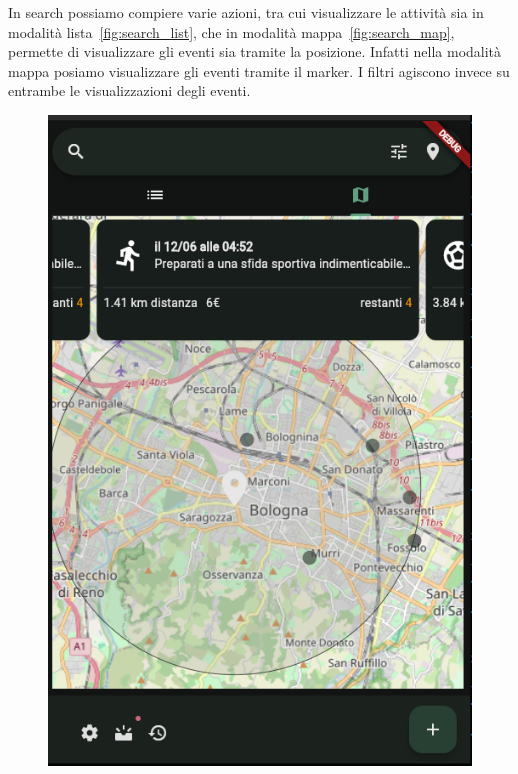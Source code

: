 \documentclass[a4paper,12pt]{article}
\begin{document}
In search possiamo compiere varie azioni, tra cui visualizzare le attività sia in modalità lista~\ref{fig:search_list}, che in modalità mappa~\ref{fig:search_map}, permette di visualizzare gli eventi sia tramite la posizione.
Infatti nella modalità mappa posiamo visualizzare gli eventi tramite il marker.
I filtri agiscono invece su entrambe le visualizzazioni degli eventi.

\begin{figure}[h]
    \begin{minipage}{0.32\textwidth}
        \centering
        \label{fig:search:map}
        \includegraphics[width=1\linewidth]{img/search_map_page.png}
    \end{minipage}
    \begin{minipage}{0.32\textwidth}

\end{minipage}
\end{figure}
\end{document}
